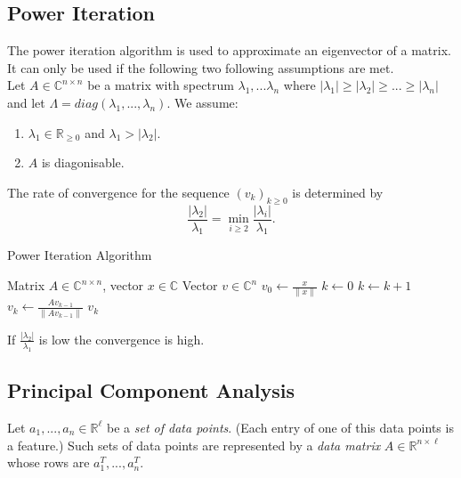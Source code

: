 \documentclass[english]{panikzettel}
\begin{document}
\subsection{Power Iteration}
\begin{halfboxl}
\vspace{-\baselineskip}
  The power iteration algorithm is used to approximate an eigenvector of a matrix. It can only be used if the following two following assumptions are met.\\
  Let $A\in\mathbb{C}^{n\times n}$ be a matrix with spectrum $\lambda_1,...\lambda_n$ where $|\lambda_1|\geq |\lambda_2|\geq ... \geq |\lambda_n|$ and let $\Lambda = diag(\lambda_1,...,\lambda_n)$. We assume:
  \begin{enumerate}
  \item $\lambda_1\in\mathbb{R}_{\geq 0}$ and $\lambda_1 > |\lambda_2|$.
  \item $A$ is diagonisable.
  \end{enumerate}

	The rate of convergence for the sequence $(v_k)_{k\geq 0}$ is determined by
	\[
	\frac{|\lambda_2|}{\lambda_1}=\min_{i\geq 2}\frac{|\lambda_i|}{\lambda_1}.
	\]
\end{halfboxl}
\begin{halfboxr}
\vspace{-\baselineskip}
\begin{algo}{Power Iteration Algorithm}
{
\renewcommand{\algorithmicrequire}{\textbf{Input:}}%
\renewcommand{\algorithmicensure}{\textbf{Output:}}%
  \begin{algorithmic}[1]
  \Require Matrix $A\in\mathbb{C}^{n\times n}$, vector $x\in\mathbb{C}$
  \Ensure Vector $v\in\mathbb{C}^n$
  \State $v_0\leftarrow\frac{x}{\parallel x \parallel}$
  \State $k\leftarrow 0$
  \Repeat
    \State $k\leftarrow k+1$
    \State $v_k\leftarrow \frac{Av_{k-1}}{\parallel Av_{k-1} \parallel}$
  \State \Return $v_k$
  \end{algorithmic}
}
\end{algo}
\end{halfboxr}

If $\frac{|\lambda_2|}{\lambda_1}$ is low the convergence is high.




\subsection{Principal Component Analysis}
Let $a_1,...,a_n \in \mathbb{R}^\ell$ be a \emph{set of data points}. (Each entry of one of this data points is a feature.) Such sets of data points are represented by a \emph{data matrix} $A \in \mathbb{R}^{n\times \ell}$ whose rows are $a_1^T,...,a_n^T$.
\end{document}
